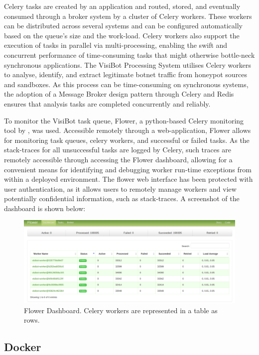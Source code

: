 Celery tasks are created by an application and routed, stored, and eventually consumed through a broker system by a cluster of Celery workers. These workers can be distributed across several systems and can be configured automatically based on the queue's size and the work-load. Celery workers also support the execution of tasks in parallel via multi-processing, enabling the swift and concurrent performance of time-consuming tasks that might otherwise bottle-neck synchronous applications. The VisiBot Processing System utilises Celery workers to analyse, identify, and extract legitimate botnet traffic from honeypot sources and sandboxes. As this process can be time-consuming on synchronous systems, the adoption of a Message Broker design pattern through Celery and Redis ensures that analysis tasks are completed concurrently and reliably.

To monitor the VisiBot task queue, Flower, a python-based Celery monitoring tool by \citet{CeleryFlower}, was used. Accessible remotely through a web-application, Flower allows for monitoring task queues, celery workers, and successful or failed tasks. As the stack-traces for all unsuccessful tasks are logged by Celery, such traces are remotely accessible through accessing the Flower dashboard, allowing for a convenient means for identifying and debugging worker run-time exceptions from within a deployed environment. The flower web interface has been protected with user authentication, as it allows users to remotely manage workers and view potentially confidential information, such as stack-traces. A screenshot of the dashboard is shown below:

\begin{figure}
    \centering
    \includegraphics[width=1.0\linewidth]{images/flower-panel.png}
    \caption{Flower Dashboard. Celery workers are represented in a table as rows.}
    \label{fig:flower_dashboard} 
\end{figure}

\subsection{Docker}

